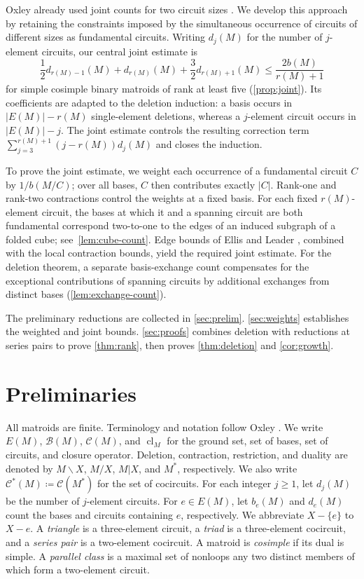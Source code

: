 \documentclass[10pt,a4paper]{article}
\numberwithin{equation}{section}
\DeclareMathOperator{\cl}{cl}
\newcommand{\BB}{\mathcal B}
\newcommand{\CC}{\mathcal C}
\begin{document}
Oxley already used joint counts for two circuit sizes
\cite[proof of Lemma~2.11]{Oxley1983}.
We develop this approach by retaining the constraints imposed by the
simultaneous occurrence of circuits of different sizes as fundamental
circuits. Writing \(d_j(M)\) for the number of \(j\)-element circuits,
our central joint estimate is
\[
 \frac12d_{r(M)-1}(M)+d_{r(M)}(M)+\frac32d_{r(M)+1}(M)
 \le\frac{2b(M)}{r(M)+1}
\]
for simple cosimple binary matroids of rank at least five
(\autoref{prop:joint}). Its coefficients are adapted to the deletion
induction: a basis occurs in \(|E(M)|-r(M)\) single-element deletions,
whereas a \(j\)-element circuit occurs in \(|E(M)|-j\).
The joint estimate controls the resulting correction term
\(\sum_{j=3}^{r(M)+1}(j-r(M))d_j(M)\) and closes the induction.

To prove the joint estimate, we weight each occurrence of a fundamental
circuit \(C\) by \(1/b(M/C)\); over all bases, \(C\) then contributes
exactly \(|C|\). Rank-one and rank-two contractions control the weights
at a fixed basis. For each fixed \(r(M)\)-element circuit, the bases
at which it and a spanning circuit are both fundamental correspond
two-to-one to the edges of an induced subgraph of a folded cube;
see~\autoref{lem:cube-count}. Edge bounds of Ellis and Leader
\cite{EllisLeader2018}, combined with the local contraction bounds,
yield the required joint estimate.
For the deletion theorem, a separate basis-exchange count compensates
for the exceptional contributions of spanning circuits by additional
exchanges from distinct bases (\autoref{lem:exchange-count}).

The preliminary reductions are collected in \autoref{sec:prelim}.
\autoref{sec:weights} establishes the weighted and joint bounds.
\autoref{sec:proofs} combines deletion with reductions at series pairs
to prove \autoref{thm:rank}, then proves \autoref{thm:deletion}
and \autoref{cor:growth}.

\section{Preliminaries}\label{sec:prelim}

All matroids are finite. Terminology and notation follow
Oxley \cite{Oxley2011}.
We write \(E(M)\), \(\BB(M)\), \(\CC(M)\), and \(\cl_M\) for
the ground set, set of bases, set of circuits, and closure operator.
Deletion, contraction, restriction, and duality are denoted by
\(M\backslash X\), \(M/X\), \(M|X\), and \(M^*\), respectively.
We also write \(\CC^*(M)\coloneqq\CC(M^*)\) for the set of cocircuits.
For each integer \(j\ge1\), let \(d_j(M)\) be the number of \(j\)-element
circuits. For \(e\in E(M)\), let \(b_e(M)\) and \(d_e(M)\)
count the bases and circuits containing \(e\), respectively. We abbreviate
\(X-\{e\}\) to \(X-e\). A \emph{triangle} is a three-element circuit,
a \emph{triad} is a three-element cocircuit, and a \emph{series pair} is a
two-element cocircuit. A matroid is \emph{cosimple} if its dual is simple.
A \emph{parallel class} is a maximal set of nonloops any two
distinct members of which form a two-element circuit.
\end{document}
